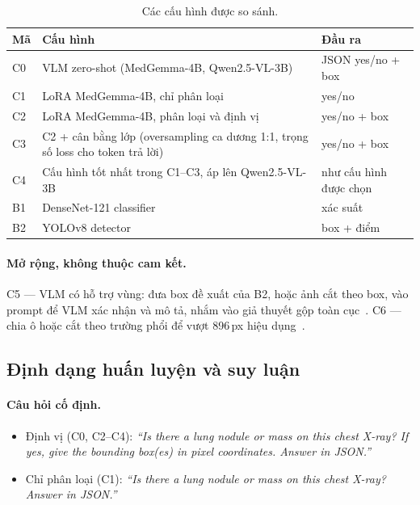 \begin{table}[H]
\centering
\caption{Các cấu hình được so sánh.}
\label{tab:configs}
\small
\begin{tabularx}{\textwidth}{@{}l L l@{}}
\toprule
\textbf{Mã} & \textbf{Cấu hình} & \textbf{Đầu ra} \\
\midrule
C0 & VLM zero-shot (MedGemma-4B, Qwen2.5-VL-3B) & JSON yes/no + box \\
C1 & LoRA MedGemma-4B, chỉ phân loại & yes/no \\
C2 & LoRA MedGemma-4B, phân loại và định vị & yes/no + box \\
C3 & C2 + cân bằng lớp (oversampling ca dương 1:1, trọng số loss cho token trả lời) & yes/no + box \\
C4 & Cấu hình tốt nhất trong C1--C3, áp lên Qwen2.5-VL-3B & như cấu hình được chọn \\
B1 & DenseNet-121 classifier & xác suất \\
B2 & YOLOv8 detector & box + điểm \\
\bottomrule
\end{tabularx}
\end{table}

\paragraph{Mở rộng, không thuộc cam kết.} C5 --- VLM có hỗ trợ vùng: đưa box đề xuất của B2, hoặc ảnh cắt theo
box, vào prompt để VLM xác nhận và mô tả, nhắm vào giả thuyết gộp toàn cục~\cite{muthyala2026frozen}. C6 --- chia
ô hoặc cắt theo trường phổi để vượt 896\,px hiệu dụng~\cite{sabottke2020resolution,kim2020matrix}.

\subsection{Định dạng huấn luyện và suy luận}

\paragraph{Câu hỏi cố định.}
\begin{itemize}
  \item Định vị (C0, C2--C4): \emph{``Is there a lung nodule or mass on this chest X-ray? If yes, give the
        bounding box(es) in pixel coordinates. Answer in JSON.''}
  \item Chỉ phân loại (C1): \emph{``Is there a lung nodule or mass on this chest X-ray? Answer in JSON.''}
\end{itemize}

